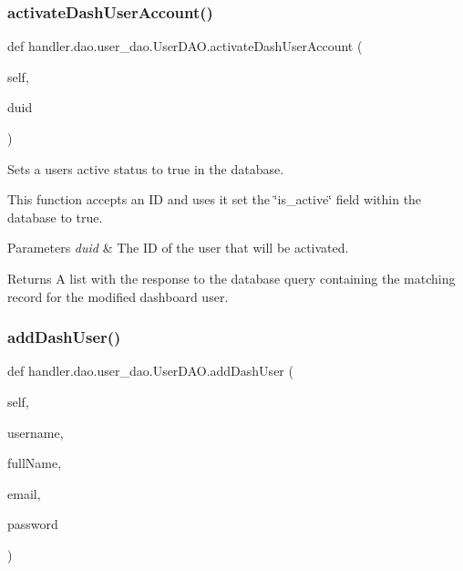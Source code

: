 \subsubsection{\texorpdfstring{activate\+Dash\+User\+Account()}{activateDashUserAccount()}}
{\footnotesize\ttfamily def handler.\+dao.\+user\+\_\+dao.\+User\+D\+A\+O.\+activate\+Dash\+User\+Account (\begin{DoxyParamCaption}\item[{}]{self,  }\item[{}]{duid }\end{DoxyParamCaption})}



Sets a user\textquotesingle{}s active status to true in the database. 

This function accepts an ID and uses it set the \char`\"{}is\+\_\+active\char`\"{} field within the database to true.


\begin{DoxyParams}{Parameters}
{\em duid} & The ID of the user that will be activated.\\
\hline
\end{DoxyParams}
\begin{DoxyReturn}{Returns}
A list with the response to the database query containing the matching record for the modified dashboard user. 
\end{DoxyReturn}
\mbox{\label{classhandler_1_1dao_1_1user__dao_1_1_user_d_a_o_a6e3f0dfc7e16a8ec2313502ca0298397}} 
\subsubsection{\texorpdfstring{add\+Dash\+User()}{addDashUser()}}
{\footnotesize\ttfamily def handler.\+dao.\+user\+\_\+dao.\+User\+D\+A\+O.\+add\+Dash\+User (\begin{DoxyParamCaption}\item[{}]{self,  }\item[{}]{username,  }\item[{}]{full\+Name,  }\item[{}]{email,  }\item[{}]{password }\end{DoxyParamCaption})}



